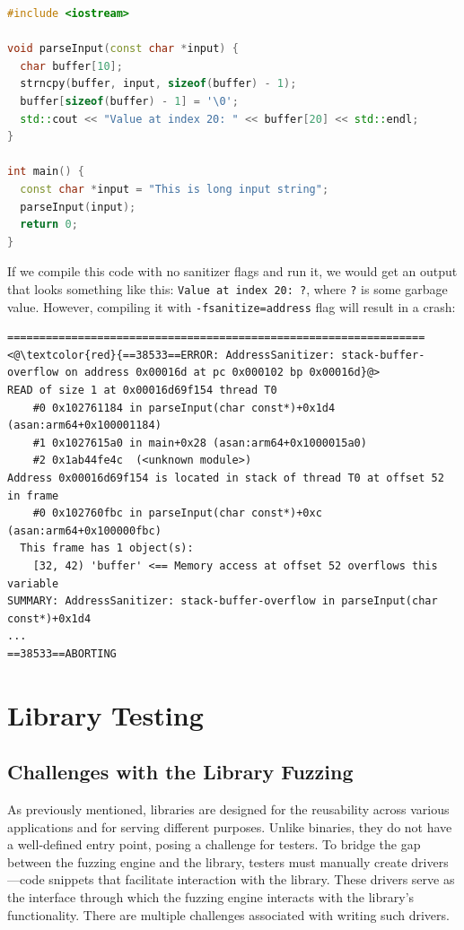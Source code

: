 \documentclass[a4paper,11pt,oneside]{report}
\begin{document}
\begin{lstlisting}[language={c++}]
#include <iostream>

void parseInput(const char *input) {
  char buffer[10];
  strncpy(buffer, input, sizeof(buffer) - 1);
  buffer[sizeof(buffer) - 1] = '\0';
  std::cout << "Value at index 20: " << buffer[20] << std::endl;
}

int main() {
  const char *input = "This is long input string";
  parseInput(input);
  return 0;
}
\end{lstlisting}

If we compile this code with no sanitizer flags and run it, we would get 
an output that looks something like this: \lstinline{Value at index 20: ?}, where \lstinline{?} is some
garbage value. However, compiling it with \lstinline{-fsanitize=address} flag will
result in a crash:

\begin{lstlisting}[style=DOS]
=================================================================
<@\textcolor{red}{==38533==ERROR: AddressSanitizer: stack-buffer-overflow on address 0x00016d at pc 0x000102 bp 0x00016d}@>
READ of size 1 at 0x00016d69f154 thread T0
    #0 0x102761184 in parseInput(char const*)+0x1d4 (asan:arm64+0x100001184)
    #1 0x1027615a0 in main+0x28 (asan:arm64+0x1000015a0)
    #2 0x1ab44fe4c  (<unknown module>)
Address 0x00016d69f154 is located in stack of thread T0 at offset 52 in frame
    #0 0x102760fbc in parseInput(char const*)+0xc (asan:arm64+0x100000fbc)
  This frame has 1 object(s):
    [32, 42) 'buffer' <== Memory access at offset 52 overflows this variable
SUMMARY: AddressSanitizer: stack-buffer-overflow in parseInput(char const*)+0x1d4
...
==38533==ABORTING
\end{lstlisting}





\section{Library Testing}

\subsection{Challenges with the Library Fuzzing}

As previously mentioned, libraries are designed for the reusability 
across various applications and for serving different purposes. 
Unlike binaries, they do not have a well-defined entry point, 
posing a challenge for testers. To bridge the gap between the fuzzing 
engine and the library, testers must manually create drivers—code 
snippets that facilitate interaction with the library. These drivers 
serve as the interface through which the fuzzing engine interacts 
with the library's functionality. There are multiple challenges
associated with writing such drivers.
\end{document}
